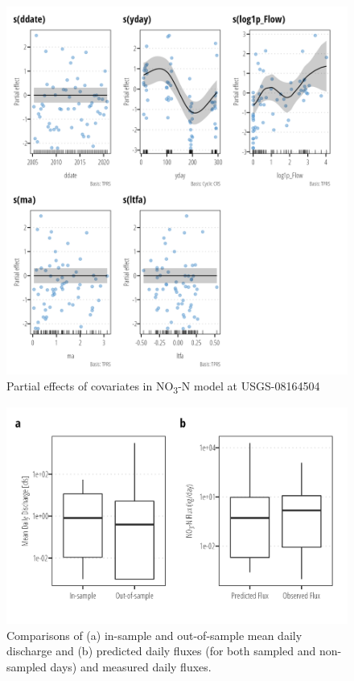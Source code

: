 \documentclass[
]{article}
\begin{document}
\begin{figure}[h]

{\centering \includegraphics{model_assessment_files/figure-pdf/unnamed-chunk-41-1.png}

}

\caption{Partial effects of covariates in NO\textsubscript{3}-N model at
USGS-08164504}

\end{figure}

\begin{figure}[h]

{\centering \includegraphics{model_assessment_files/figure-pdf/unnamed-chunk-42-1.png}

}

\caption{Comparisons of (a) in-sample and out-of-sample mean daily
discharge and (b) predicted daily fluxes (for both sampled and
non-sampled days) and measured daily fluxes.}

\end{figure}
\end{document}
